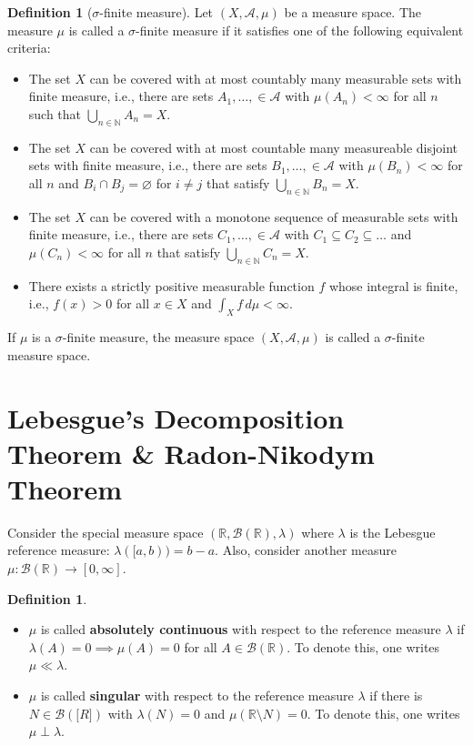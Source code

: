 \documentclass{article}
\theoremstyle{definition}
\theoremstyle{theorem}
\newtheorem{definition}[theorem]{Definition}
\begin{document}
\begin{definition}[$\sigma$-finite measure]
Let $(X,\mathcal{A}, \mu)$ be a measure space. The measure $\mu$ is called a $\sigma$-finite measure if it satisfies one of the following equivalent criteria:
\begin{itemize}
    \item The set $X$ can be covered with at most countably many measurable sets with finite measure, i.e., there are sets $A_1,\dots, \in \mathcal{A}$ with $\mu(A_n)< \infty$ for all $n$ such that $\bigcup_{n\in \mathbb{N}} A_n = X$.
    
    
    \item The set $X$ can be covered with at most countable many measureable disjoint sets with finite measure, i.e., there are sets $B_1,\dots, \in \mathcal{A}$ with $\mu(B_n) < \infty$ for all $n$ and $B_i \cap B_j = \varnothing$ for $i\neq j$ that satisfy $\bigcup_{n\in \mathbb{N}} B_n = X$.
    
    
    \item The set $X$ can be covered with a monotone sequence of measurable sets with finite measure, i.e., there are sets $C_1,\dots, \in \mathcal{A}$ with $C_1 \subseteq C_2 \subseteq \dots$ and $\mu(C_n) < \infty$ for all $n$ that satisfy $\bigcup_{n\in \mathbb{N}} C_n = X$.
    
    \item There exists a strictly positive measurable function $f$ whose integral is finite, i.e., $f(x) > 0$ for all $x\in X$ and $\int_X f\,d\mu < \infty$. 
\end{itemize}
If $\mu$ is a $\sigma$-finite measure, the measure space $(X,\mathcal{A},\mu)$ is called a $\sigma$-finite measure space. 
\end{definition}




\section{Lebesgue's Decomposition Theorem \& Radon-Nikodym Theorem}

Consider the special measure space $(\mathbb{R},\mathcal{B}(\mathbb{R}),\lambda)$ where $\lambda$ is the Lebesgue reference measure: $\lambda([a,b)) = b-a$. Also, consider another measure $\mu: \mathcal{B}(\mathbb{R}) \to [0,\infty]$. 

\begin{definition}
$\,$
\begin{itemize}
    \item $\mu$ is called \textbf{absolutely continuous} with respect to the reference measure $\lambda$ if $\lambda(A) = 0 \implies \mu(A) = 0$ for all $A \in \mathcal{B}(\mathbb{R})$. To denote this, one writes $\mu \ll \lambda$.
    
    \item $\mu$ is called \textbf{singular} with respect to the reference measure $\lambda$ if there is $N \in \mathcal{B}(\mathbb[R])$ with $\lambda(N) = 0$ and $\mu(\mathbb{R}\setminus N) = 0$. To denote this, one writes $\mu \perp \lambda$.  
\end{itemize}
\end{definition}
\end{document}
